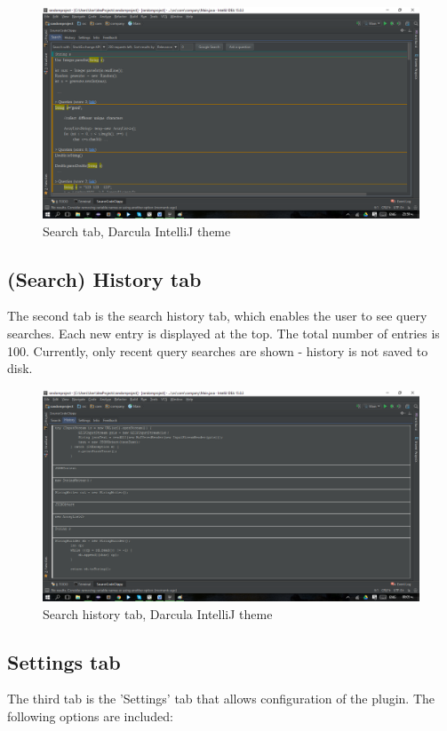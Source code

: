 \documentclass{l4proj}
\begin{document}
\begin{figure}[H]
\includegraphics[scale=0.4]{tab-search}
\centering
\caption{Search tab, Darcula IntelliJ theme}
\label{fig:search-tab}
\end{figure}

\subsection{(Search) History tab}
The second tab is the search history tab, which enables the user to see query searches. Each new entry is displayed at the top. The total number of entries is 100. Currently, only recent query searches are shown - history is not saved to disk.

\begin{figure}[H]
\includegraphics[scale=0.4]{tab-history}
\centering
\caption{Search history tab, Darcula IntelliJ theme}
\label{fig:history-tab}
\end{figure}

\subsection{Settings tab}
The third tab is the 'Settings' tab that allows configuration of the plugin. The following options are included:\\
\end{document}
